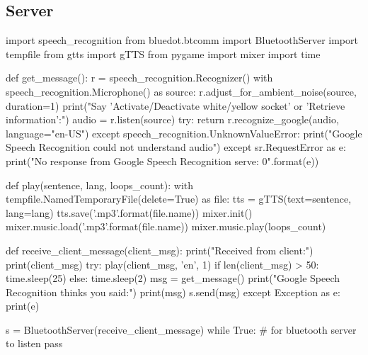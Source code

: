 \documentclass[12pt, a4paper, onside]{article}
\begin{document}
\subsection{Server}
\begin{python}
import speech_recognition
from bluedot.btcomm import BluetoothServer
import tempfile
from gtts import gTTS
from pygame import mixer
import time

def get_message():
    r = speech_recognition.Recognizer()
    with speech_recognition.Microphone() as source:
      r.adjust_for_ambient_noise(source, duration=1)
      print("Say 'Activate/Deactivate white/yellow socket' or 'Retrieve information':")
      audio = r.listen(source)
    try:
      return r.recognize_google(audio, language="en-US")
    except speech_recognition.UnknownValueError:
      print("Google Speech Recognition could not understand audio")
    except sr.RequestError as e:
      print("No response from Google Speech Recognition serve: {0}".format(e))

def play(sentence, lang, loops_count):
  with tempfile.NamedTemporaryFile(delete=True) as file:
    tts = gTTS(text=sentence, lang=lang)
    tts.save('{}.mp3'.format(file.name))
    mixer.init()
    mixer.music.load('{}.mp3'.format(file.name))
    mixer.music.play(loops_count)

def receive_client_message(client_msg):
  print("Received from client:")
  print(client_msg)
  try:
    play(client_msg, 'en', 1)
    if len(client_msg) > 50:
      time.sleep(25)
    else:
      time.sleep(2)
    msg = get_message()
    print("Google Speech Recognition thinks you said:")
    print(msg)
    s.send(msg)
  except Exception as e:
    print(e)

s = BluetoothServer(receive_client_message)
while True: # for bluetooth server to listen
  pass
\end{python}
\end{document}
